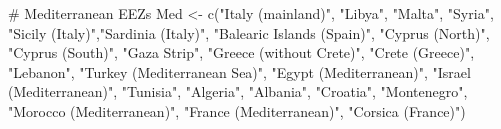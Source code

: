 \documentclass[
]{article}
\newenvironment{Shaded}{\begin{snugshade}}{\end{snugshade}}
\newcommand{\CommentTok}[1]{\textcolor[rgb]{0.37,0.37,0.37}{#1}}
\newcommand{\FunctionTok}[1]{\textcolor[rgb]{0.28,0.35,0.67}{#1}}
\newcommand{\NormalTok}[1]{\textcolor[rgb]{0.00,0.23,0.31}{#1}}
\newcommand{\OtherTok}[1]{\textcolor[rgb]{0.00,0.23,0.31}{#1}}
\newcommand{\StringTok}[1]{\textcolor[rgb]{0.13,0.47,0.30}{#1}}
\begin{document}
\begin{Shaded}
\begin{Highlighting}[]
\CommentTok{\# Mediterranean EEZs}
\NormalTok{Med }\OtherTok{\textless{}{-}} \FunctionTok{c}\NormalTok{(}\StringTok{"Italy (mainland)"}\NormalTok{, }\StringTok{"Libya"}\NormalTok{, }\StringTok{"Malta"}\NormalTok{, }\StringTok{"Syria"}\NormalTok{, }\StringTok{"Sicily (Italy)"}\NormalTok{,}\StringTok{"Sardinia (Italy)"}\NormalTok{, }
         \StringTok{"Balearic Islands (Spain)"}\NormalTok{, }\StringTok{"Cyprus (North)"}\NormalTok{, }\StringTok{"Cyprus (South)"}\NormalTok{, }
         \StringTok{"Gaza Strip"}\NormalTok{, }\StringTok{"Greece (without Crete)"}\NormalTok{, }\StringTok{"Crete (Greece)"}\NormalTok{, }\StringTok{"Lebanon"}\NormalTok{, }
         \StringTok{"Turkey (Mediterranean Sea)"}\NormalTok{, }\StringTok{"Egypt (Mediterranean)"}\NormalTok{, }\StringTok{"Israel (Mediterranean)"}\NormalTok{, }\StringTok{"Tunisia"}\NormalTok{, }
         \StringTok{"Algeria"}\NormalTok{, }\StringTok{"Albania"}\NormalTok{, }\StringTok{"Croatia"}\NormalTok{, }\StringTok{"Montenegro"}\NormalTok{, }\StringTok{"Morocco (Mediterranean)"}\NormalTok{, }
         \StringTok{"France (Mediterranean)"}\NormalTok{, }\StringTok{"Corsica (France)"}\NormalTok{)}


\end{Highlighting}
\end{Shaded}
\end{document}
